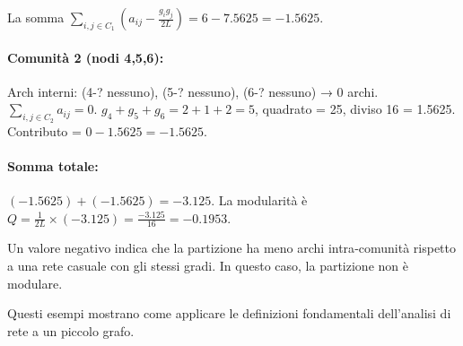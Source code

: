 La somma $\sum_{i,j \in C_1} (a_{ij} - \frac{g_i g_j}{2L}) = 6 - 7.5625 = -1.5625$.

\paragraph{Comunità 2 (nodi 4,5,6):}
Arch interni: (4-? nessuno), (5-? nessuno), (6-? nessuno) → 0 archi.
$\sum_{i,j \in C_2} a_{ij} = 0$.
$g_4+g_5+g_6 = 2+1+2 = 5$, quadrato = 25, diviso 16 = 1.5625.
Contributo = $0 - 1.5625 = -1.5625$.

\paragraph{Somma totale:} $(-1.5625) + (-1.5625) = -3.125$.
La modularità è $Q = \frac{1}{2L} \times (-3.125) = \frac{-3.125}{16} = -0.1953$.

Un valore negativo indica che la partizione ha meno archi intra‑comunità rispetto a una rete casuale con gli stessi gradi. In questo caso, la partizione non è modulare.

Questi esempi mostrano come applicare le definizioni fondamentali dell'analisi di rete a un piccolo grafo.

